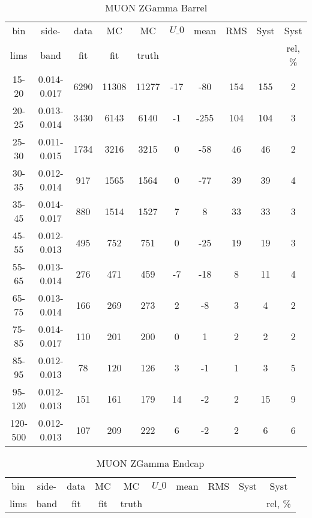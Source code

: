 \documentclass{beamer}
\begin{document}
\begin{frame}
\begin{table}[h]
  	\tiny
  \begin{center}
  \caption{MUON ZGamma Barrel}
  \begin{tabular}{|c|c|c|c|c|c|c|c|c|c|}
    bin & side- & data & MC & MC    & $U\_{0}$ & mean & RMS & Syst & Syst \\ 
    lims & band & fit & fit & truth &       &      &     &      & rel, \% \\ \hline
    15-20 & 0.014-0.017 & 6290 & 11308 & 11277 & -17 & -80 & 154 & 155 & 2  \\ \hline
    20-25 & 0.013-0.014 & 3430 & 6143 & 6140 & -1 & -255 & 104 & 104 & 3  \\ \hline
    25-30 & 0.011-0.015 & 1734 & 3216 & 3215 & 0 & -58 & 46 & 46 & 2  \\ \hline
    30-35 & 0.012-0.014 & 917 & 1565 & 1564 & 0 & -77 & 39 & 39 & 4  \\ \hline
    35-45 & 0.014-0.017 & 880 & 1514 & 1527 & 7 & 8 & 33 & 33 & 3  \\ \hline
    45-55 & 0.012-0.013 & 495 & 752 & 751 & 0 & -25 & 19 & 19 & 3  \\ \hline
    55-65 & 0.013-0.014 & 276 & 471 & 459 & -7 & -18 & 8 & 11 & 4  \\ \hline
    65-75 & 0.013-0.014 & 166 & 269 & 273 & 2 & -8 & 3 & 4 & 2  \\ \hline
    75-85 & 0.014-0.017 & 110 & 201 & 200 & 0 & 1 & 2 & 2 & 2  \\ \hline
    85-95 & 0.012-0.013 & 78 & 120 & 126 & 3 & -1 & 1 & 3 & 5  \\ \hline
    95-120 & 0.012-0.013 & 151 & 161 & 179 & 14 & -2 & 2 & 15 & 9  \\ \hline
    120-500 & 0.012-0.013 & 107 & 209 & 222 & 6 & -2 & 2 & 6 & 6  \\ \hline
  \end{tabular}
  \label{tab:systSbVar_Meth1_MUON_ZGamma_Barrel}
  \end{center}
\end{table}
\begin{table}[h]
  	\tiny
  \begin{center}
  \caption{MUON ZGamma Endcap}
  \begin{tabular}{|c|c|c|c|c|c|c|c|c|c|}
    bin & side- & data & MC & MC    & $U\_{0}$ & mean & RMS & Syst & Syst \\ 
    lims & band & fit & fit & truth &       &      &     &      & rel, \% \\ \hline

\end{tabular}
\end{center}
\end{table}
\end{frame}
\end{document}

